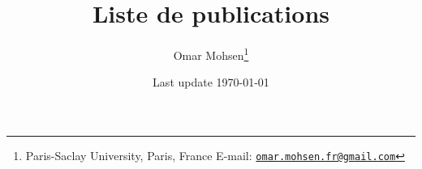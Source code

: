 \documentclass[a4paper, 13pt]{article}
\begin{document}
\title{Liste de publications}
\author{Omar Mohsen\footnote{{\footnotesize
Paris-Saclay University, Paris, France
\vskip-2pt E-mail: \href{mailto:omar.mohsen.fr@gmail.com}{\texttt{omar.mohsen.fr@gmail.com}}}}}
\date{Last update \today}
\maketitle
\nocite{MohsenBlowup}
  \nocite{MohsenGrpTangent}
  \nocite{MohsenIndex}
  \nocite{MohsenIndexMuens}
  \nocite{MohsenTangentCone}
  \nocite{MohsenMaxHypo}
  \nocite{MohsenChernSimons}
  \nocite{MohsenWitten}
  \nocite{MohsenConnesShwartz}
 \nocite{MohsenConvolutionSingularFoliations}
 \nocite{MohsenWodizki}


\begin{refcontext}[sorting=nyt]
\printbibliography[heading=none]
\end{refcontext}
\end{document}
